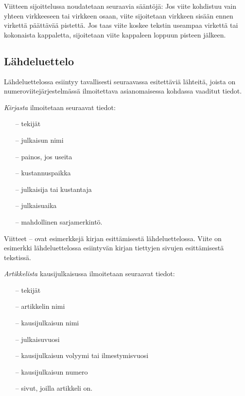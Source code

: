 \documentclass[finnish, 12pt, a4paper, sci, utf8, pdfa]{aaltothesis}
\begin{document}
Viitteen sijoittelussa noudatetaan seuraavia sääntöjä:
Jos viite kohdistuu vain yhteen virkkeeseen tai virkkeen 
osaan, viite \cite{Kauranen} sijoitetaan virkkeen sisään ennen virkettä
päättävää pistettä. Jos taas viite koskee tekstin useampaa
virkettä tai kokonaista kappaletta, sijoitetaan viite kappaleen loppuun 
pisteen jälkeen. \cite{Kauranen} 

\subsection*{Lähdeluettelo} 

Lähdeluettelossa esiintyy tavallisesti seuraavassa esitettäviä
lähteitä, joista on numeroviitejärjestelmässä ilmoitettava
asianomaisessa kohdassa vaaditut tiedot.

\textit{Kirjasta} ilmoitetaan seuraavat tiedot:

\begin{itemize}
\item[--]tekijät 
\item[--]julkaisun nimi
\item[--]painos, jos useita
\item[--]kustannuspaikka
\item[--]julkaisija tai kustantaja
\item[--]julkaisuaika
\item[--]mahdollinen sarjamerkintö. 
\end{itemize}

Viitteet \cite{Kauranen}--\cite{Koblitz} ovat esimerkkejä kirjan
esittämisestä lähdeluettelossa. Viite \cite[s.\ 83--124]{Koblitz} on
esimerkki lähdeluettelossa esiintyvän kirjan tiettyjen sivujen
esittämisestä tekstissä.

\textit{Artikkelista} kausijulkaisussa ilmoitetaan seuraavat tiedot:

\begin{itemize}

\item[--]tekijät
\item[--]artikkelin nimi
\item[--]kausijulkaisun nimi
\item[--]julkaisuvuosi
\item[--]kausijulkaisun volyymi tai ilmestymisvuosi
\item[--]kausijulkaisun numero
\item[--]sivut, joilla artikkeli on.
\end{itemize}
\end{document}
